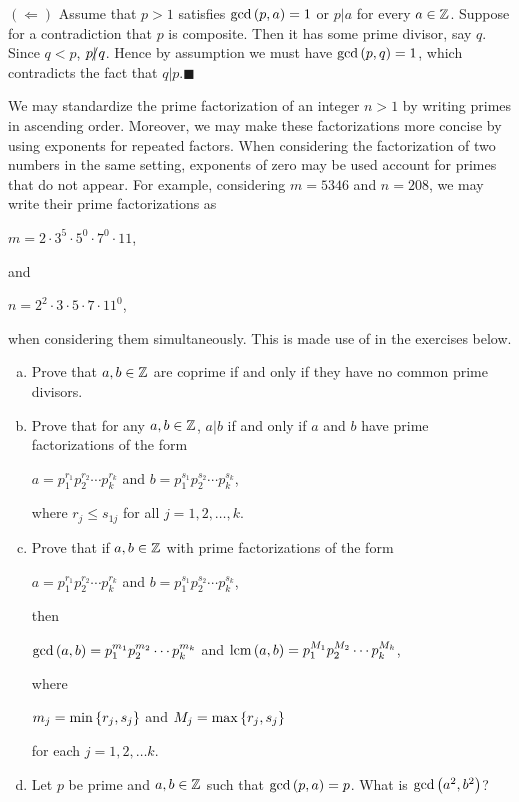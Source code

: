 \documentclass[11pt,fleqn,dvipsnames,usenames]{article}
\newcommand{\p}{\noindent}
\newcommand{\ENDPRF}{\hfill $\blacksquare$}
\begin{document}
\p $(\Leftarrow)$ Assume that $p>1$ satisfies $\text{gcd}\left(p,a\right) = 1$ or $p|a$ for every $a\in\mathbb{Z}$.  Suppose for a contradiction that $p$ is composite.  Then it has some prime divisor, say $q$.  Since $q < p$, $p|\kern-0.9ex{/} q$.  Hence by assumption we must have $\text{gcd}\left(p,q\right) = 1$, which contradicts the fact that $q|p$.\ENDPRF
\vsp

\begin{remark}
We may standardize the prime factorization of an integer $n > 1$ by writing primes in ascending order.  Moreover, we may make these factorizations more concise by using exponents for repeated factors.  When considering the factorization of two numbers in the same setting, exponents of zero may be used account for primes that do not appear.  For example, considering $m = 5346$ and $n = 208$, we may write their prime factorizations as
\begin{center}
$m = 2\cdot 3^5\cdot 5^0 \cdot 7^0\cdot 11$,
\end{center}
and
\begin{center}
$n = 2^2\cdot 3\cdot 5\cdot 7\cdot 11^{0}$,
\end{center}
when considering them simultaneously.  This is made use of in the exercises below.
\end{remark}

\exercises
\begin{enumerate}[(a)]
\item Prove that $a,b\in\mathbb{Z}$ are coprime if and only if they have no common prime divisors.
\item Prove that for any $a,b\in\mathbb{Z}$, $a|b$ if and only if $a$ and $b$ have prime factorizations of the form
\begin{center}
$a = p_{1}^{r_{1}}p_{2}^{r_{2}}\cdots p_{k}^{r_{k}}$ and $b = p_{1}^{s_{1}}p_{2}^{s_{2}}\cdots p_{k}^{s_{k}}$,
\end{center}
where $r_{j}\leq s_{1j}$ for all $j = 1,2,\ldots, k$.
\item Prove that if $a,b\in\mathbb{Z}$ with prime factorizations of the form
\begin{center}
$a = p_{1}^{r_{1}}p_{2}^{r_{2}}\cdots p_{k}^{r_{k}}$ and $b = p_{1}^{s_{1}}p_{2}^{s_{2}}\cdots p_{k}^{s_{k}}$,
\end{center}
then
\begin{center}
$\text{gcd}\left(a,b\right) = p_{1}^{m_{1}}p_{2}^{m_{2}}\cdots p_{k}^{m_{k}}$ and $\text{lcm}\left(a,b\right) = p_{1}^{M_{1}}p_{2}^{M_{2}}\cdots p_{k}^{M_{k}}$,
\end{center}
where
\begin{center}
$m_{j} = \min\left\{r_{j},s_{j}\right\}$ and $M_{j} = \max\left\{r_{j},s_{j}\right\}$
\end{center}
for each $j=1,2,\ldots k$.
\item Let $p$ be prime and $a,b\in\mathbb{Z}$ such that $\text{gcd}\left(p,a\right) = p$.  What is $\text{gcd}\left(a^{2},b^{2}\right)$?
\end{enumerate}
\vsp
\end{document}
